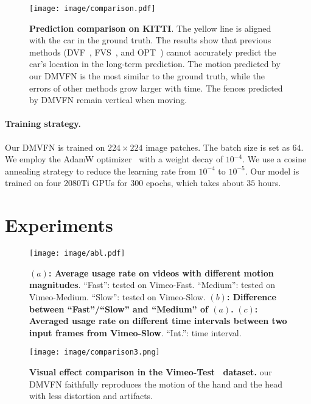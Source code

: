 \documentclass[10pt,twocolumn,letterpaper]{article}
\begin{document}
\begin{figure}[th]
	\centering
	\texttt{[image: image/comparison.pdf]}
	\caption{\textbf{Prediction comparison on KITTI}. The yellow line is aligned with the car in the ground truth. The results show that previous methods (DVF~\cite{dvf}, FVS~\cite{fvs}, and OPT~\cite{wu2022optimizing}) cannot accurately predict the car's location in the long-term prediction. The motion predicted by our DMVFN is the most similar to the ground truth, while the errors of other methods grow larger with time. The fences predicted by DMVFN remain vertical when moving.}
	\label{fig:kitti}
\end{figure}

\paragraph{Training strategy.} Our DMVFN is trained on $224\times224$ image patches. The batch size is set as $64$. 
We employ the AdamW optimizer~\cite{adam,loshchilov2018fixing} with a weight decay of $10^{-4}$.
We use a cosine annealing strategy to reduce the learning rate from $10^{-4}$ to $10^{-5}$.
Our model is trained on four 2080Ti GPUs for $300$ epochs, which takes about $35$ hours.






 	\section{Experiments}


\begin{figure*}[th]
	\centering
	\texttt{[image: image/abl.pdf]}
	\caption{\textbf{$(a)$: Average usage rate on videos with different motion magnitudes}. ``Fast'': tested on Vimeo-Fast. ``Medium'': tested on Vimeo-Medium. ``Slow'': tested on Vimeo-Slow.
    \textbf{$(b)$: Difference between ``Fast''/``Slow'' and ``Medium'' of $(a)$.}
 \textbf{$(c)$: Averaged usage rate on different time intervals between two input frames from Vimeo-Slow}. ``Int.'': time interval.}
	\label{fig:ablation1}
\end{figure*}


 \begin{figure}[th]
 	\centering
 	\texttt{[image: image/comparison3.png]}
 	\caption{\textbf{Visual effect comparison in the Vimeo-Test~\cite{vimeo} dataset.} our DMVFN faithfully reproduces the motion of the hand and the head with less distortion and artifacts.}
 	\label{fig:Vimeo}
    \vspace{-1em}
\end{figure}
\end{document}

